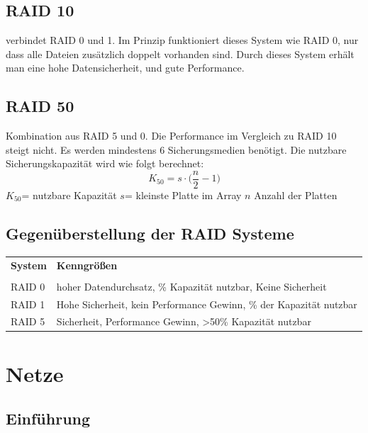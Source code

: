 \documentclass[12pt,a4paper]{article}
\begin{document}
\subsection{RAID 10}
verbindet RAID 0 und 1. Im Prinzip funktioniert dieses System wie RAID 0, nur dass alle Dateien zusätzlich doppelt vorhanden sind. Durch dieses System erhält man eine hohe Datensicherheit, und gute Performance.
\subsection{RAID 50}
Kombination aus RAID 5 und 0. Die Performance im Vergleich zu RAID 10 steigt nicht. Es werden mindestens 6 Sicherungsmedien benötigt. \newline
Die nutzbare Sicherungskapazität wird wie folgt berechnet:
\begin{equation*}
K_{50} = s\cdot \Big(\dfrac{n}{2}-1\Big)
\end{equation*}
$K_{50}$= nutzbare Kapazität \hspace{1.5cm} $s$= kleinste Platte im Array \hspace{1.5cm} $n$ Anzahl der Platten
\subsection{Gegenüberstellung der RAID Systeme}
\begin{table}[h]
\centering
\begin{tabularx}{15cm}{|XX|}
\hline
\textbf{System}&\textbf{Kenngrößen} \\
& \\
\hline
RAID 0& hoher Datendurchsatz, \newline 100\% Kapazität nutzbar, \newline Keine Sicherheit \\
\hline
RAID 1& Hohe Sicherheit, \newline kein Performance Gewinn, \newline 50\% der Kapazität nutzbar\\
\hline
RAID 5& Sicherheit, \newline Performance Gewinn, \newline >50\% Kapazität nutzbar\\
\hline
\end{tabularx}
\end{table}
\newpage
\section{Netze}
\subsection{Einführung}
\end{document}

